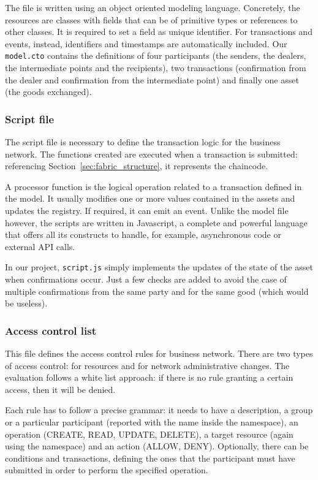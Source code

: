 The file is written using an object oriented modeling language. Concretely, the resources are classes with fields that can be of primitive types or references to other classes. It is required to set a field as unique identifier. For transactions and events, instead, identifiers and timestamps are automatically included. Our \texttt{model.cto} contains the definitions of four participants (the senders, the dealers, the intermediate points and the recipients), two transactions (confirmation from the dealer and confirmation from the intermediate point) and finally one asset (the goods exchanged).

\subsubsection{Script file}
The script file is necessary to define the transaction logic for the business network. The functions created are executed when a transaction is submitted: referencing Section~\ref{sec:fabric_structure}, it represents the chaincode.

A processor function is the logical operation related to a transaction defined in the model. It usually modifies one or more values contained in the assets and updates the registry. If required, it can emit an event. Unlike the model file however, the scripts are written in Javascript, a complete and powerful language that offers all its constructs to handle, for example, asynchronous code or external API calls.

In our project, \texttt{script.js} simply implements the updates of the state of the asset when confirmations occur. Just a few checks are added to avoid the case of multiple confirmations from the same party and for the same good (which would be useless).

\subsubsection{Access control list}
This file defines the access control rules for business network. There are two types of access control: for resources and for network administrative changes. The evaluation follows a white list approach: if there is no rule granting a certain access, then it will be denied.

Each rule has to follow a precise grammar: it needs to have a description, a group or a particular participant (reported with the name inside the namespace), an operation (CREATE, READ, UPDATE, DELETE), a target resource (again using the namespace) and an action (ALLOW, DENY). Optionally, there can be conditions and transactions, defining the ones that the participant must have submitted in order to perform the specified operation.

